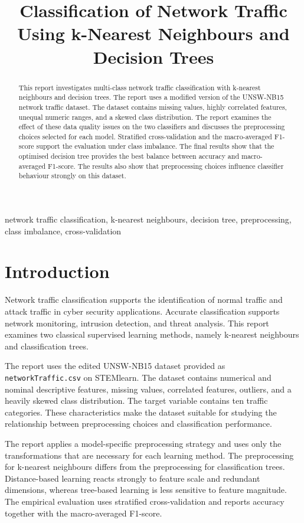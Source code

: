 \documentclass[conference,10pt]{IEEEtran}
\title{Classification of Network Traffic Using k-Nearest Neighbours and Decision Trees}
\author{
\IEEEauthorblockN{F. de Bruin}
\IEEEauthorblockA{
Student Number: 26990075 \\
Module Code: 741 \\
Email: \texttt{26990075@sun.ac.za}
}
}
\begin{document}
\pagestyle{plain}
\maketitle
\thispagestyle{plain}

\begin{abstract}
This report investigates multi-class network traffic classification with k-nearest neighbours and decision trees. The report uses a modified version of the UNSW-NB15 network traffic dataset. The dataset contains missing values, highly correlated features, unequal numeric ranges, and a skewed class distribution. The report examines the effect of these data quality issues on the two classifiers and discusses the preprocessing choices selected for each model. Stratified cross-validation and the macro-averaged F1-score support the evaluation under class imbalance. The final results show that the optimised decision tree provides the best balance between accuracy and macro-averaged F1-score. The results also show that preprocessing choices influence classifier behaviour strongly on this dataset.
\end{abstract}

\begin{IEEEkeywords}
network traffic classification, k-nearest neighbours, decision tree, preprocessing, class imbalance, cross-validation
\end{IEEEkeywords}

\section{Introduction}
Network traffic classification supports the identification of normal traffic and attack traffic in cyber security applications. Accurate classification supports network monitoring, intrusion detection, and threat analysis. This report examines two classical supervised learning methods, namely k-nearest neighbours and classification trees.

The report uses the edited UNSW-NB15 dataset provided as \texttt{networkTraffic.csv} on STEMlearn. The dataset contains numerical and nominal descriptive features, missing values, correlated features, outliers, and a heavily skewed class distribution. The target variable contains ten traffic categories. These characteristics make the dataset suitable for studying the relationship between preprocessing choices and classification performance.

The report applies a model-specific preprocessing strategy and uses only the transformations that are necessary for each learning method. The preprocessing for k-nearest neighbours differs from the preprocessing for classification trees. Distance-based learning reacts strongly to feature scale and redundant dimensions, whereas tree-based learning is less sensitive to feature magnitude. The empirical evaluation uses stratified cross-validation and reports accuracy together with the macro-averaged F1-score.
\end{document}
